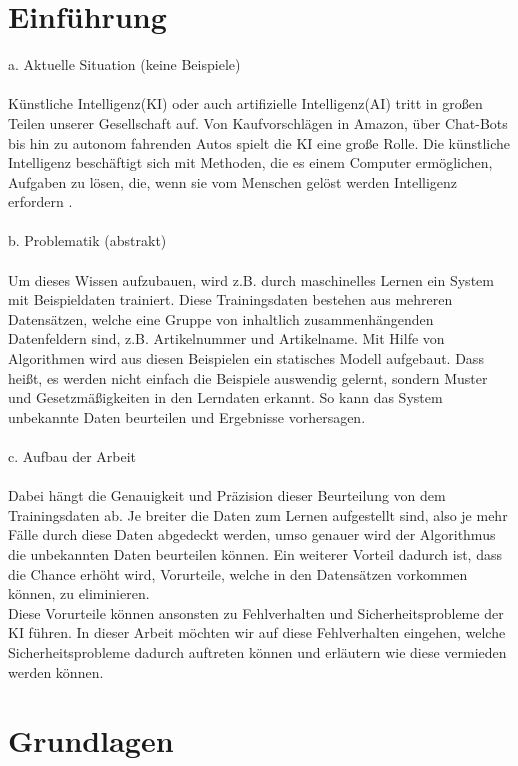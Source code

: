 \documentclass[12pt,oneside,a4paper,parskip]{scrbook}
\begin{document}
\chapter{Einführung}
\label{chapter:intro}
a.	Aktuelle Situation (keine Beispiele)
\\\\
Künstliche Intelligenz(KI) oder auch artifizielle Intelligenz(AI) tritt in großen Teilen unserer Gesellschaft auf. Von Kaufvorschlägen in Amazon, über Chat-Bots bis hin zu autonom fahrenden Autos spielt die KI eine große Rolle. Die künstliche Intelligenz beschäftigt sich mit Methoden, die es einem Computer ermöglichen, Aufgaben zu lösen, die, wenn sie vom Menschen gelöst werden Intelligenz erfordern \cite{kiDefinition}.
\\\\
b.	Problematik (abstrakt)
\\\\
Um dieses Wissen aufzubauen, wird z.B. durch maschinelles Lernen ein System mit Beispieldaten trainiert. 
Diese Trainingsdaten bestehen aus mehreren Datensätzen, welche eine Gruppe von inhaltlich zusammenhängenden Datenfeldern sind, z.B. Artikelnummer und Artikelname.
Mit Hilfe von Algorithmen wird aus diesen Beispielen ein statisches Modell aufgebaut. Dass heißt, es werden nicht einfach die Beispiele auswendig gelernt, sondern Muster und Gesetzmäßigkeiten in den Lerndaten erkannt. So kann das System unbekannte Daten beurteilen und Ergebnisse vorhersagen.
\\\\
c.	Aufbau der Arbeit 
\\\\
Dabei hängt die Genauigkeit und Präzision dieser Beurteilung von dem Trainingsdaten ab. Je breiter die Daten zum Lernen aufgestellt sind, also je mehr Fälle durch diese Daten abgedeckt werden, umso genauer wird der Algorithmus die unbekannten Daten beurteilen können. Ein weiterer Vorteil dadurch ist, dass die Chance erhöht wird, Vorurteile, welche in den Datensätzen vorkommen können, zu eliminieren.\\
Diese Vorurteile können ansonsten zu Fehlverhalten und Sicherheitsprobleme der KI führen. In dieser Arbeit möchten wir auf diese Fehlverhalten eingehen, welche Sicherheitsprobleme dadurch auftreten können und erläutern wie diese vermieden werden können.


\chapter{Grundlagen}
\end{document}

